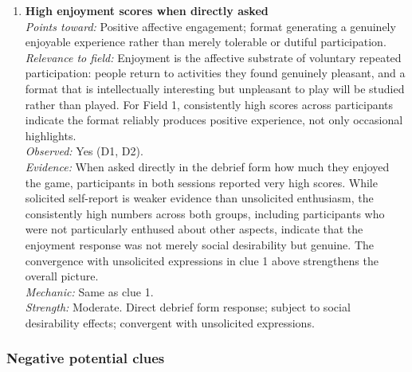 \begin{enumerate}
\item \textbf{High enjoyment scores when directly asked}\\
\textit{Points toward:} Positive affective engagement; format generating a genuinely enjoyable experience rather than merely tolerable or dutiful participation.\\
\textit{Relevance to field:} Enjoyment is the affective substrate of voluntary repeated participation: people return to activities they found genuinely pleasant, and a format that is intellectually interesting but unpleasant to play will be studied rather than played. For Field 1, consistently high scores across participants indicate the format reliably produces positive experience, not only occasional highlights.\\
\textit{Observed:} Yes (D1, D2).\\
\textit{Evidence:} When asked directly in the debrief form how much they enjoyed the game, participants in both sessions reported very high scores. While solicited self-report is weaker evidence than unsolicited enthusiasm, the consistently high numbers across both groups, including participants who were not particularly enthused about other aspects, indicate that the enjoyment response was not merely social desirability but genuine. The convergence with unsolicited expressions in clue 1 above strengthens the overall picture.\\
\textit{Mechanic:} Same as clue 1.\\
\textit{Strength:} Moderate. Direct debrief form response; subject to social desirability effects; convergent with unsolicited expressions.

\end{enumerate}

\subsubsection*{Negative potential clues}

